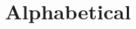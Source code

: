 \documentclass[12pt,twoside,openright,a4paper]{book}
\begin{document}
\ifdefined\PRINTED

\section{Alphabetical}

\renewcommand{\FlagsSee}[1]{}	%

\end{document}

